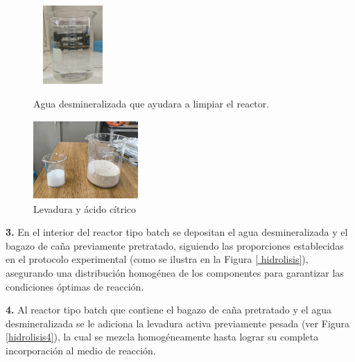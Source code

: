 \documentclass[12pt]{article}
\begin{document}
		 \begin{figure}[H]
		 	\centering
		 	\begin{minipage}{0.46\textwidth}
		 		\centering
		 		\includegraphics[width=3cm, height=3cm]{imagenes/agua} %
		 		\caption{ Agua desmineralizada que ayudara a limpiar el reactor.}
		 		\label{agua}
		 	\end{minipage}
		 	\hfill
		 	\begin{minipage}{0.48\textwidth}
		 		\centering
		 		\includegraphics[width=4cm, height=3cm]{imagenes/levadura y acido citrico} %
		 		\caption{Levadura y ácido cítrico}
		 		\label{pesado2}
		 	\end{minipage}
		 \end{figure}
		 
		 
	     \textbf{3.} En el interior del reactor tipo batch se depositan el agua desmineralizada y el bagazo de caña previamente pretratado, siguiendo las proporciones establecidas en el protocolo experimental (como se ilustra en la Figura \ref{ hidrolisis}), asegurando una distribución homogénea de los componentes para garantizar las condiciones óptimas de reacción.
	     	
	     \textbf{4.} Al reactor tipo batch que contiene el bagazo de caña pretratado y el agua desmineralizada se le adiciona la levadura activa previamente pesada (ver Figura \ref{hidrolisis4}), la cual se mezcla homogéneamente hasta lograr su completa incorporación al medio de reacción. 
	     
	    
	     
\end{document}
